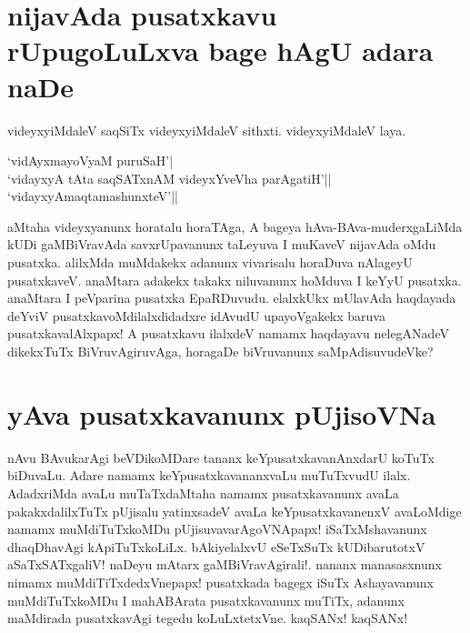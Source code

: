 \section*{nijavAda pusatxkavu rUpugoLuLxva bage hAgU adara naDe}

videyxyiMdaleV saqSiTx videyxyiMdaleV sithxti. videyxyiMdaleV laya.

\begin{shloka}
`vidAyxmayoV\s yaM puruSaH'|\label{133b}\\
`vidayxyA tAta saqSATxnAM videyxYveVha parAgatiH'||\label{133}\\
`vidayxyA\s maqtamashunxteV'||\label{133a}
\end{shloka}
aMtaha videyxyanunx horatalu horaTAga, A bageya hAva-BAva-muderxgaLiMda kUDi gaMBiVravAda savxrUpavanunx taLeyuva I muKaveV nijavAda oMdu pusatxka. alilxMda muMdakekx adanunx vivarisalu horaDuva nAlageyU pusatxkaveV. anaMtara adakekx takakx niluvanunx hoMduva I keYyU pusatxka. anaMtara I peVparina pusatxka EpaRDuvudu. elalxkUkx mUlavAda haqdayada deYviV pusatxkavoMdilalxdidadxre idAvudU upayoVgakekx baruva pusatxkavalAlxpapx! A pusatxkavu ilalxdeV namamx haqdayavu nelegANadeV dikekxTuTx BiVruvAgiruvAga, horagaDe biVruvanunx saMpAdisuvudeVke?

\section*{yAva pusatxkavanunx pUjisoVNa}

nAvu BAvukarAgi beVDikoMDare tananx keYpusatxkavanAnxdarU koTuTx biDuvaLu. Adare namamx keYpusatxkavananxvaLu muTuTxvudU ilalx. AdadxriMda avaLu muTaTxdaMtaha namamx pusatxkavanunx avaLa pakakxdalilxTuTx pUjisalu yatinxsadeV avaLa keYpusatxkavanenxV avaLoMdige namamx muMdiTuTxkoMDu pUjisuvavarAgoVNApapx! iSaTxMshavanunx dhaqDhavAgi kApiTuTxkoLiLx. bAkiyelalxvU eSeTxSuTx kUDibarutotxV aSaTxSATxgaliV! naDeyu mAtarx gaMBiVravAgirali!. nananx manasasxnunx nimamx muMdiTiTxdedxVnepapx! pusatxkada bagegx iSuTx Ashayavanunx muMdiTuTxkoMDu I mahABArata pusatxkavanunx muTiTx, adanunx maMdirada pusatxkavAgi tegedu koLuLxtetxVne. kaqSANx! kaqSANx!



